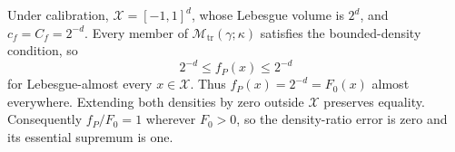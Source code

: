 Under calibration, \(\mathcal X=[-1,1]^d\), whose Lebesgue volume is \(2^d\), and \(c_f=C_f=2^{-d}\). Every member of \(\mathcal M_{\mathrm{tr}}(\gamma;\kappa)\) satisfies the bounded-density condition, so
\[
2^{-d}\le f_P(x)\le 2^{-d}
\]
for Lebesgue-almost every \(x\in\mathcal X\). Thus \(f_P(x)=2^{-d}=F_0(x)\) almost everywhere. Extending both densities by zero outside \(\mathcal X\) preserves equality. Consequently \(f_P/F_0=1\) wherever \(F_0>0\), so the density-ratio error is zero and its essential supremum is one.
